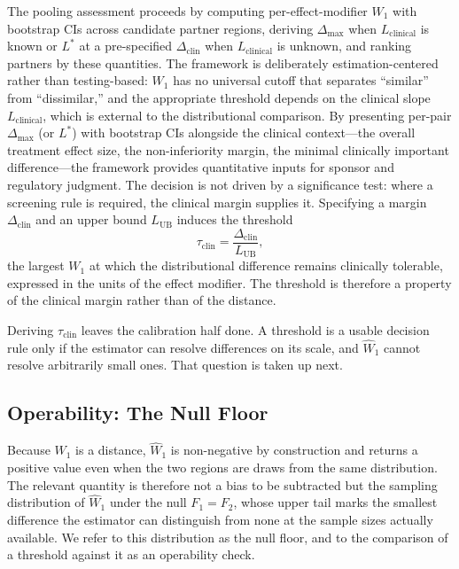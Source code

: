 \documentclass[AMA,Times1COL]{WileyNJDv5}
\begin{document}
The pooling assessment proceeds by computing per-effect-modifier $W_1$ with bootstrap CIs across candidate partner regions, deriving $\Delta_{\max}$ when $L_{\text{clinical}}$ is known or $L^*$ at a pre-specified $\Delta_{\text{clin}}$ when $L_{\text{clinical}}$ is unknown, and ranking partners by these quantities. The framework is deliberately estimation-centered rather than testing-based: $W_1$ has no universal cutoff that separates ``similar'' from ``dissimilar,'' and the appropriate threshold depends on the clinical slope $L_{\text{clinical}}$, which is external to the distributional comparison. By presenting per-pair $\Delta_{\max}$ (or $L^*$) with bootstrap CIs alongside the clinical context---the overall treatment effect size, the non-inferiority margin, the minimal clinically important difference---the framework provides quantitative inputs for sponsor and regulatory judgment. The decision is not driven by a significance test\cite{wasserstein2016}: where a screening rule is required, the clinical margin supplies it. Specifying a margin $\Delta_{\text{clin}}$ and an upper bound $L_{\text{UB}}$ induces the threshold
\begin{equation}
\tau_{\text{clin}} = \frac{\Delta_{\text{clin}}}{L_{\text{UB}}},
\label{eq:tau_clin}
\end{equation}
the largest $W_1$ at which the distributional difference remains clinically tolerable, expressed in the units of the effect modifier. The threshold is therefore a property of the clinical margin rather than of the distance.

Deriving $\tau_{\text{clin}}$ leaves the calibration half done. A threshold is a usable decision rule only if the estimator can resolve differences on its scale, and $\widehat{W}_1$ cannot resolve arbitrarily small ones. That question is taken up next.

\subsection{Operability: The Null Floor}\label{sec:operability}

Because $W_1$ is a distance, $\widehat{W}_1$ is non-negative by construction and returns a positive value even when the two regions are draws from the same distribution. The relevant quantity is therefore not a bias to be subtracted but the sampling distribution of $\widehat{W}_1$ under the null $F_1 = F_2$, whose upper tail marks the smallest difference the estimator can distinguish from none at the sample sizes actually available. We refer to this distribution as the null floor, and to the comparison of a threshold against it as an operability check.
\end{document}
